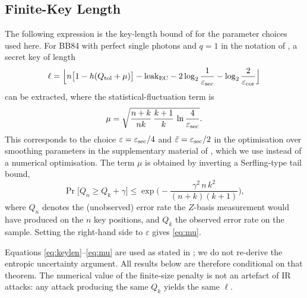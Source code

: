 \subsection{Finite-Key Length}
The following expression is the key-length bound of \cite{Tomamichel12} for the parameter choices used here. For BB84 with perfect single photons and $q=1$ in the notation of \cite{Tomamichel12}, a secret key of length
\begin{equation}\label{eq:keylen}
\ell=\Big\lfloor n\big[1-h(Q_{\mathrm{tol}}+\mu)\big]-\mathrm{leak}_{\mathrm{EC}}-2\log_2\frac1{\varepsilon_{\mathrm{sec}}}-\log_2\frac2{\varepsilon_{\mathrm{cor}}}\Big\rfloor
\end{equation}
can be extracted, where the statistical-fluctuation term is
\begin{equation}\label{eq:mu}
\mu=\sqrt{\frac{n+k}{nk}\,\frac{k+1}{k}\,\ln\frac{4}{\varepsilon_{\mathrm{sec}}}}.
\end{equation}
This corresponds to the choice $\varepsilon=\varepsilon_{\mathrm{sec}}/4$ and $\bar\varepsilon=\varepsilon_{\mathrm{sec}}/2$ in the optimisation over smoothing parameters in the supplementary material of \cite{Tomamichel12}, which we use instead of a numerical optimisation. The term $\mu$ is obtained by inverting a Serfling-type tail bound,
\begin{equation}\label{eq:serfling}
\Pr\big[Q_n\ge Q_k+\gamma\big]\le\exp\!\Big(-\frac{\gamma^2\,n\,k^2}{(n+k)(k+1)}\Big),
\end{equation}
where $Q_n$ denotes the (unobserved) error rate the $Z$-basis measurement would have produced on the $n$ key positions, and $Q_k$ the observed error rate on the sample. Setting the right-hand side to $\varepsilon$ gives \eqref{eq:mu}.

\begin{remark}
Equations \eqref{eq:keylen}--\eqref{eq:mu} are used as stated in \cite{Tomamichel12}; we do not re-derive the entropic uncertainty argument. All results below are therefore conditional on that theorem. The numerical value of the finite-size penalty is not an artefact of IR attacks: any attack producing the same $Q_k$ yields the same $\ell$.
\end{remark}
